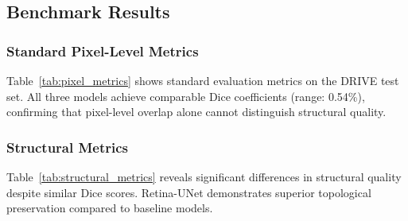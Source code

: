 \documentclass[conference]{IEEEtran}
\begin{document}
\subsection{Benchmark Results}
\subsubsection{Standard Pixel-Level Metrics}
Table~\ref{tab:pixel_metrics} shows standard evaluation metrics on the DRIVE test set. All three models achieve comparable Dice coefficients (range: 0.54\%), confirming that pixel-level overlap alone cannot distinguish structural quality.

\begin{table}[htbp]
\caption{Standard Pixel-Level Metrics (DRIVE, n=20)}
\label{tab:pixel_metrics}
\centering
{}
\end{table}

\subsubsection{Structural Metrics}
Table~\ref{tab:structural_metrics} reveals significant differences in structural quality despite similar Dice scores. Retina-UNet demonstrates superior topological preservation compared to baseline models.
\end{document}
